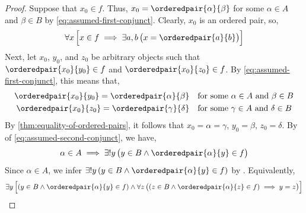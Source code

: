 \begin{proof}
    \vspace{0.3cm}
    \noindent
    Suppose that \( x_{0} \in f \). Thus, \( x_{0} = \orderedpair{\alpha}{\beta} \) for some \( \alpha \in A \) and \( \beta \in B \)
    by \eqref{eq:assumed-first-conjunct}. Clearly, \( x_{0} \) is an ordered pair, so,
    \begin{equation}
        \label{eq:first-conjunct-of-function-definition}
        \forall x \, \Big[ x \in f \implies \exists a,b \, \big( x = \orderedpair{a}{b} \big) \Big]
    \end{equation}
    Next, let \( x_{0} \), \( y_{0} \), and \( z_{0} \) be arbitrary objects such that \( \orderedpair{x_{0}}{y_{0}} \in f \)
    and \( \orderedpair{x_{0}}{z_{0}} \in f \). By \eqref{eq:assumed-first-conjunct}, this means that,
    \begin{equation*}
        \begin{aligned}
            \orderedpair{x_{0}}{y_{0}} = \orderedpair{\alpha}{\beta}& \\
            \orderedpair{x_{0}}{z_{0}} = \orderedpair{\gamma}{\delta}& \\
        \end{aligned}
        \begin{aligned}
            &\quad\text{for some \( \alpha \in A \) and \( \beta \in B \)}\\
            &\quad\text{for some \( \gamma \in A \) and \( \delta \in B \)}
        \end{aligned}
    \end{equation*}
    By \cref{thm:equality-of-ordered-pairs}, it follows that \( x_{0} = \alpha = \gamma \),
    \( y_{0} = \beta \), \( z_{0} = \delta \).
    By  of \eqref{eq:assumed-second-conjunct}, we have,
    \begin{equation*}
        \alpha \in A \implies \exists! y \, \big( y \in B \land \orderedpair{\alpha}{y} \in f \big)
    \end{equation*}
    Since \( \alpha \in A \), we infer \( \exists! y \, \mleft( y \in B \land \orderedpair{\alpha}{y} \in f \mright) \) by
    . Equivalently,
    \begin{equation}
        \label{eq:re-express-uniqueness-equivalently}
        \exists y \, \Big[ \mleft( y \in B \land \orderedpair{\alpha}{y} \in f \mright) \land
        \forall z \, \big( \mleft( z \in B \land \orderedpair{\alpha}{z} \in f \mright) \implies y = z \big)\Big]

\end{equation}
\end{proof}
